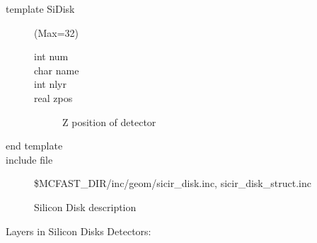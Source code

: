 \begin{description}
\item[{\rm template} SiDisk](Max=32)  
\begin{description}
\item[{\rm  int} num]
\item[{\rm  char} name]
\item[{\rm  int} nlyr]
\item[{\rm  real} zpos]  Z position of detector
\end{description}
\item[end template]
\item[include file] \$MCFAST\_DIR/inc/geom/sicir\_disk.inc, sicir\_disk\_struct.inc 
\end{description}

\begin{figure} [htbp]
\centerline{\epsfxsize=6.0in }
\caption{\label{sidisk} Silicon Disk description}
\end{figure}

Layers in Silicon Disks Detectors:

